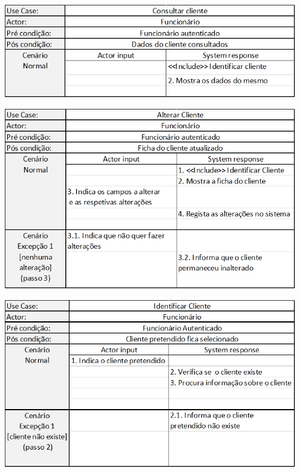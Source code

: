 \documentclass[11pt]{article} %
\begin{document}
\begin{enumerate}
\begin{center}
	\end{center}
	\begin{center}
		\includegraphics[width = 5in]{ac_consultarcliente.png} 
	\end{center}
	\begin{center}
		\includegraphics[width = 5in]{ac_altcliente.png}
	\end{center}
	\begin{center}
		\includegraphics[width = 5in]{ac_idcliente.png}
	\end{center}
	\begin{center}

\end{center}
\end{enumerate}
\end{document}
